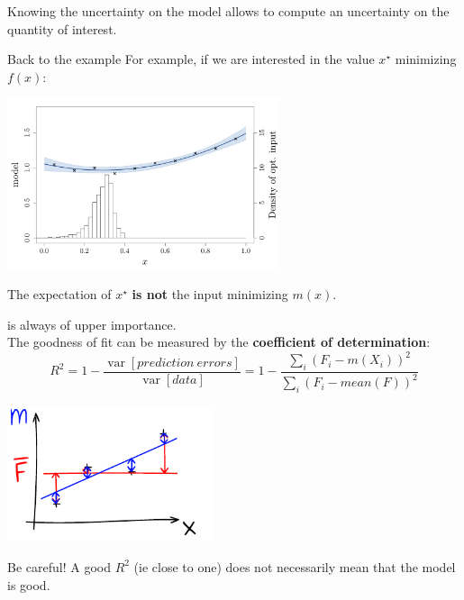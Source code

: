 \documentclass{beamer}
\DeclareMathOperator*{\Var}{var}
\begin{document}
\begin{frame}{}
Knowing the uncertainty on the model allows to compute an uncertainty on the quantity of interest.
\begin{exampleblock}{Back to the example}
For example, if we are interested in the value $x^\star$ minimizing $f(x)$:
\begin{center}
  \includegraphics[height=5cm]{figures/R/linreg_6}
\end{center}
\end{exampleblock}
\alert{The expectation of $x^\star$ \textbf{is not} the input minimizing $m(x).$}
\end{frame}


\begin{frame}{}
\textbf{} is always of upper importance.\\ 
\vspace{3mm}
The goodness of fit can be measured by the \textbf{coefficient of determination}:
$$R^2 =  1 - \frac{\Var[prediction\ errors]}{\Var[data]} = 1 - \frac{\sum_i (F_i-m(X_i))^2}{\sum_i (F_i-mean(F))^2}$$
\begin{center}
  \includegraphics[height=4cm]{figures/ink_R2}
\end{center}
\alert{Be careful!} A good $R^2$ (ie close to one) does not necessarily mean that the model is good.
\end{frame}
\end{document}
